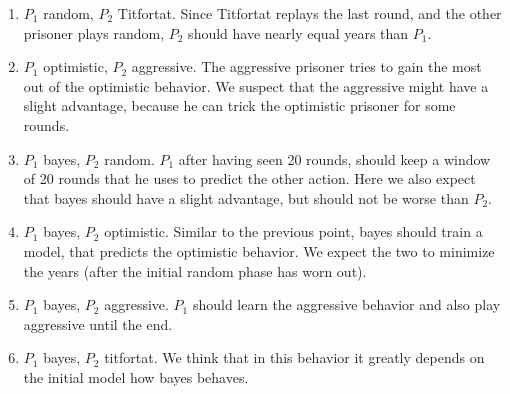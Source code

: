 \documentclass{acm_proc_article-sp}
\begin{document}
\begin{enumerate}
	\item $P_1$ random, $P_2$ Titfortat. Since Titfortat replays the last round, and the
    other prisoner plays random, $P_2$ should have nearly equal years than $P_1$.
    \label{item:p1random-p2titfortat}
    
	\item $P_1$ optimistic, $P_2$ aggressive. The aggressive prisoner tries to gain the
      most out of the optimistic behavior. We suspect that the aggressive might have a slight advantage, because he can trick the optimistic prisoner for some rounds.
    \item $P_1$ bayes, $P_2$ random. $P_1$ after having seen 20 rounds, should keep a window of 20 rounds that he uses to predict the other action. Here we also expect that bayes should have a slight advantage, but should not be worse than $P_2$.
    \item $P_1$ bayes, $P_2$ optimistic. Similar to the previous point, bayes should train
    a model, that predicts the optimistic behavior. We expect the two to minimize the years (after the initial random phase has worn out).
    \item $P_1$ bayes, $P_2$ aggressive. $P_1$ should learn the aggressive behavior and also
    play aggressive until the end.
    \item $P_1$ bayes, $P_2$ titfortat. We think that in this behavior it greatly depends
    on the initial model how bayes behaves.
\end{enumerate}
\end{document}
